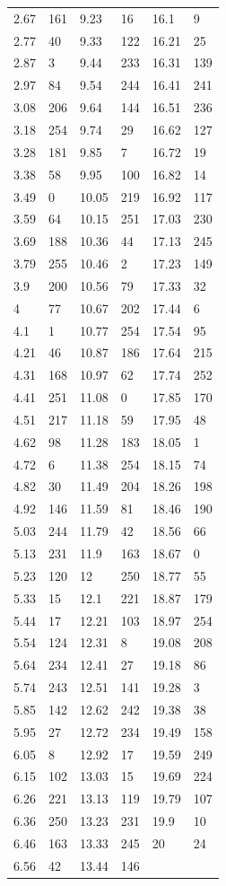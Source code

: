 \documentclass{article}
\begin{document}
\begin{table}[h!]
\begin{tabular}{|l|l|l|l|l|l|}
2.67	&	161	&	9.23	&	16	&	16.1	&	9	\\
2.77	&	40	&	9.33	&	122	&	16.21	&	25	\\
2.87	&	3	&	9.44	&	233	&	16.31	&	139	\\
2.97	&	84	&	9.54	&	244	&	16.41	&	241	\\
3.08	&	206	&	9.64	&	144	&	16.51	&	236	\\
3.18	&	254	&	9.74	&	29	&	16.62	&	127	\\
3.28	&	181	&	9.85	&	7	&	16.72	&	19	\\
3.38	&	58	&	9.95	&	100	&	16.82	&	14	\\
3.49	&	0	&	10.05	&	219	&	16.92	&	117	\\
3.59	&	64	&	10.15	&	251	&	17.03	&	230	\\
3.69	&	188	&	10.36	&	44	&	17.13	&	245	\\
3.79	&	255	&	10.46	&	2	&	17.23	&	149	\\
3.9	&	200	&	10.56	&	79	&	17.33	&	32	\\
4	&	77	&	10.67	&	202	&	17.44	&	6	\\
4.1	&	1	&	10.77	&	254	&	17.54	&	95	\\
4.21	&	46	&	10.87	&	186	&	17.64	&	215	\\
4.31	&	168	&	10.97	&	62	&	17.74	&	252	\\
4.41	&	251	&	11.08	&	0	&	17.85	&	170	\\
4.51	&	217	&	11.18	&	59	&	17.95	&	48	\\
4.62	&	98	&	11.28	&	183	&	18.05	&	1	\\
4.72	&	6	&	11.38	&	254	&	18.15	&	74	\\
4.82	&	30	&	11.49	&	204	&	18.26	&	198	\\
4.92	&	146	&	11.59	&	81	&	18.46	&	190	\\
5.03	&	244	&	11.79	&	42	&	18.56	&	66	\\
5.13	&	231	&	11.9	&	163	&	18.67	&	0	\\
5.23	&	120	&	12	&	250	&	18.77	&	55	\\
5.33	&	15	&	12.1	&	221	&	18.87	&	179	\\
5.44	&	17	&	12.21	&	103	&	18.97	&	254	\\
5.54	&	124	&	12.31	&	8	&	19.08	&	208	\\
5.64	&	234	&	12.41	&	27	&	19.18	&	86	\\
5.74	&	243	&	12.51	&	141	&	19.28	&	3	\\
5.85	&	142	&	12.62	&	242	&	19.38	&	38	\\
5.95	&	27	&	12.72	&	234	&	19.49	&	158	\\
6.05	&	8	&	12.92	&	17	&	19.59	&	249	\\
6.15	&	102	&	13.03	&	15	&	19.69	&	224	\\
6.26	&	221	&	13.13	&	119	&	19.79	&	107	\\
6.36	&	250	&	13.23	&	231	&	19.9	&	10	\\
6.46	&	163	&	13.33	&	245	&	20	&	24	\\
6.56	&	42	&	13.44	&	146	&		&		\\
\hline
\end{tabular}
\end{table}
\end{document}
